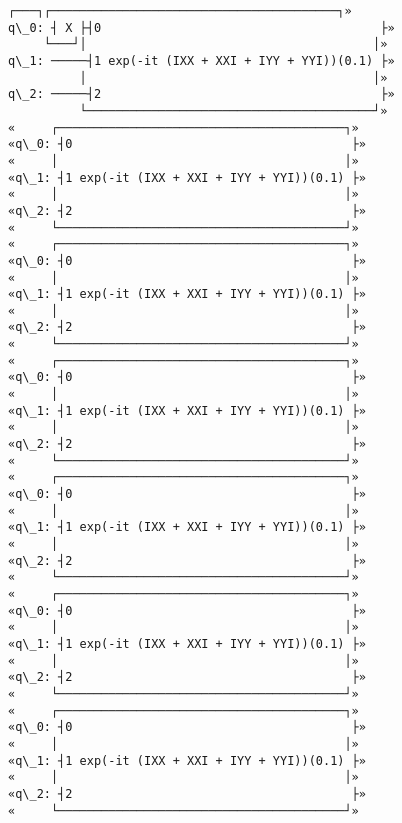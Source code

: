 \documentclass[11pt]{article}
\begin{document}
    \begin{Verbatim}[commandchars=\\\{\}]
     ┌───┐┌────────────────────────────────────────┐»
q\_0: ┤ X ├┤0                                       ├»
     └───┘│                                        │»
q\_1: ─────┤1 exp(-it (IXX + XXI + IYY + YYI))(0.1) ├»
          │                                        │»
q\_2: ─────┤2                                       ├»
          └────────────────────────────────────────┘»
«     ┌────────────────────────────────────────┐»
«q\_0: ┤0                                       ├»
«     │                                        │»
«q\_1: ┤1 exp(-it (IXX + XXI + IYY + YYI))(0.1) ├»
«     │                                        │»
«q\_2: ┤2                                       ├»
«     └────────────────────────────────────────┘»
«     ┌────────────────────────────────────────┐»
«q\_0: ┤0                                       ├»
«     │                                        │»
«q\_1: ┤1 exp(-it (IXX + XXI + IYY + YYI))(0.1) ├»
«     │                                        │»
«q\_2: ┤2                                       ├»
«     └────────────────────────────────────────┘»
«     ┌────────────────────────────────────────┐»
«q\_0: ┤0                                       ├»
«     │                                        │»
«q\_1: ┤1 exp(-it (IXX + XXI + IYY + YYI))(0.1) ├»
«     │                                        │»
«q\_2: ┤2                                       ├»
«     └────────────────────────────────────────┘»
«     ┌────────────────────────────────────────┐»
«q\_0: ┤0                                       ├»
«     │                                        │»
«q\_1: ┤1 exp(-it (IXX + XXI + IYY + YYI))(0.1) ├»
«     │                                        │»
«q\_2: ┤2                                       ├»
«     └────────────────────────────────────────┘»
«     ┌────────────────────────────────────────┐»
«q\_0: ┤0                                       ├»
«     │                                        │»
«q\_1: ┤1 exp(-it (IXX + XXI + IYY + YYI))(0.1) ├»
«     │                                        │»
«q\_2: ┤2                                       ├»
«     └────────────────────────────────────────┘»
«     ┌────────────────────────────────────────┐»
«q\_0: ┤0                                       ├»
«     │                                        │»
«q\_1: ┤1 exp(-it (IXX + XXI + IYY + YYI))(0.1) ├»
«     │                                        │»
«q\_2: ┤2                                       ├»
«     └────────────────────────────────────────┘»

\end{Verbatim}
\end{document}
